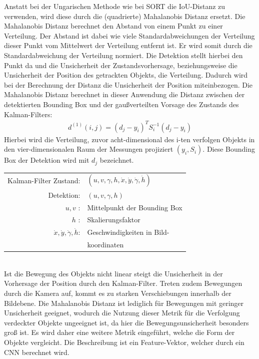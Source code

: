 \documentclass[conference]{IEEEtran}
\begin{document}
	Anstatt bei der Ungarischen Methode wie bei SORT die IoU-Distanz zu verwenden, wird diese durch die (quadrierte) Mahalanobis Distanz ersetzt. Die Mahalanobis Distanz berechnet den Abstand von einem Punkt zu einer Verteilung. Der Abstand ist dabei wie viele Standardabweichungen der Verteilung dieser Punkt vom Mittelwert der Verteilung entfernt ist. Er wird somit durch die Standardabweichung der Verteilung normiert. Die Detektion stellt hierbei den Punkt da und die Unsicherheit der Zustandsvorhersage, beziehungsweise die Unsicherheit der Position des getrackten Objekts, die Verteilung. Dadurch wird bei der Berechnung der Distanz die Unsicherheit der Position miteinbezogen. 
	Die Mahalanobis Distanz berechnet in dieser Anwendung die Distanz zwischen der detektierten Bounding Box und der gaußverteilten Vorsage des Zustands des Kalman-Filters:
	\begin{align}
		d^{(1)}(i,j)= (d_j - y_i)^TS^{-1}_i(d_j - y_i)
	\end{align}
	Hierbei wird die Verteilung, zuvor acht-dimensional des i-ten verfolgen Objekts in den vier-dimensionalen Raum der Messungen projiziert $(y_i, S_i)$. Diese Bounding Box der Detektion wird mit $d_j$ bezeichnet. \\
	
	
	\begin{tabular}{r l}
		Kalman-Filter Zustand: & $(u,v,\gamma,h,\dot{x},\dot{y},\dot{\gamma},\dot{h})$ \\
		Detektion: & $(u,v,\gamma,h)$ \\
		$u,v$ :& Mittelpunkt der Bounding Box \\
		$h$ :& Skalierungsfaktor \\
		$\dot{x},\dot{y},\dot{\gamma},\dot{h}$: & Geschwindigkeiten in Bild- \\	
		& koordinaten \\
	\end{tabular} \\
	
	Ist die Bewegung des Objekts nicht linear steigt die Unsicherheit in der Vorhersage der Position durch den Kalman-Filter. Treten zudem Bewegungen durch die Kamera auf, kommt es zu starken Verschiebungen innerhalb der Bildebene. Die Mahalanobis Distanz ist lediglich für Bewegungen mit geringer Unsicherheit geeignet, wodurch die Nutzung dieser Metrik für die Verfolgung verdeckter Objekte ungeeignet ist, da hier die Bewegungsunsicherheit besonders groß ist.
	Es wird daher eine weitere Metrik eingeführt, welche die Form der Objekte vergleicht. Die Beschreibung ist ein Feature-Vektor, welcher durch ein CNN berechnet wird. 
	
\end{document}
